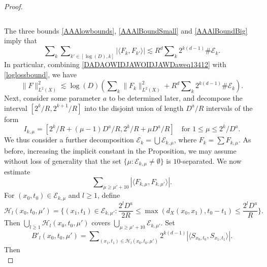 \begin{proof}
\begin{itemize}
\begin{equation}
    \end{equation}
\end{itemize}
%
The three bounds \eqref{AAAlowbounds}, \eqref{AAAlBoundSmall} and \eqref{AAAlBoundBig} imply that
%
\begin{equation} \label{DADAOWIDJAWOIDJAWDaweq13412}
    \sum\nolimits_k \sum\nolimits_{k' \in [\log(D), k]} |\langle F_k, F_{k'} \rangle| \lesssim R^d \sum\nolimits_k 2^{k (d-1)} \# \mathcal{E}_k.
\end{equation}
%
In particular, combining \eqref{DADAOWIDJAWOIDJAWDaweq13412} with \eqref{loglossbound}, we have
%
\begin{equation} \label{DPOWADPAWKDPOWAKDOPWAK}
    \| F \|_{L^2(X)}^2 \lesssim \log(D) \left( \sum\nolimits_k \| F_k \|_{L^2(X)}^2 + R^d \sum\nolimits_k 2^{k (d-1)} \# \mathcal{E}_k \right).
\end{equation}
%
Next, consider some parameter $a$ to be determined later, and decompose the interval $[2^{k} / R, 2^{k+1} / R]$ into the disjoint union of length $D^a / R$ intervals of the form
%
\begin{equation}
    I_{k,\mu} = [ 2^{k} / R + (\mu - 1) D^a / R, 2^{k} / R + \mu D^a / R] \quad\text{for $1 \leq \mu \leq 2^k/D^a$}.
\end{equation}
%
We thus consider a further decomposition $\mathcal{E}_k = \bigcup \mathcal{E}_{k,\mu}$, where $F_k = \sum F_{k,\mu}$. As before, increasing the implicit constant in the Proposition, we may assume without loss of generality that the set $\{ \mu: \mathcal{E}_{k,\mu} \neq \emptyset \}$ is $10$-separated. We now estimate
%
\begin{equation}
    \sum\nolimits_{\mu \geq \mu' + 10} |\langle F_{k,\mu}, F_{k,\mu'} \rangle|.
\end{equation}
%
For $(x_0,t_0) \in \mathcal{E}_{k,\mu}$ and $l \geq 1$, define
%
\begin{equation}
    \mathcal{H}_l(x_0,t_0,\mu') = \Big\{ (x_1,t_1) \in \mathcal{E}_{k,\mu'} : \frac{2^l D^a}{2R} \leq \max(d_X(x_0,x_1), t_0 - t_1) \leq \frac{2^l D^a}{R} \Big\}.
\end{equation}
%
Then $\bigcup_{l \geq 1} \mathcal{H}_l(x_0,t_0,\mu')$ covers $\bigcup_{\mu \geq \mu' + 10} \mathcal{E}_{k,\mu'}$. Set
%
\begin{equation}
    B'_l(x_0,t_0,\mu') = \sum\nolimits_{(x_1,t_1) \in \mathcal{H}_l(x_0,t_0,\mu')} 2^{k(d-1)} |\langle {S\!}_{x_0,t_0}, {S\!}_{x_1,t_1} \rangle|.
\end{equation}
%
Then
%
\begin{equation}

\end{equation}
\end{proof}
